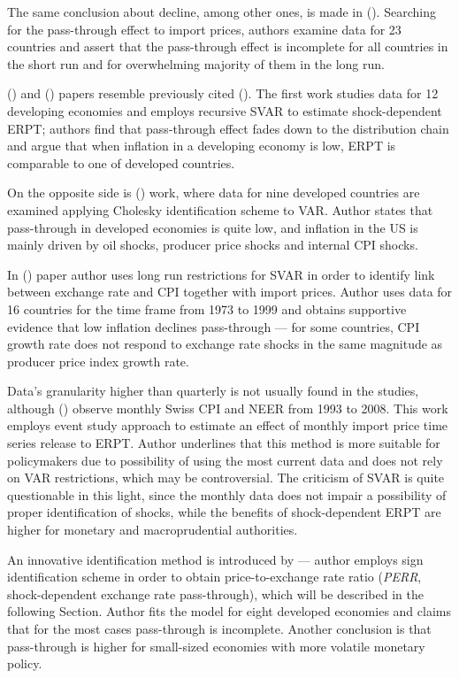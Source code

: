\documentclass[12pt, a4paper]{extarticle}
\begin{document}
The same conclusion about decline, among other ones, is made in (\cite{Campa2005}). Searching for the pass-through effect to import prices, authors examine data for 23 countries and assert that the pass-through effect is incomplete for all countries in the short run and for overwhelming majority of them in the long run.

(\cite{CaZorzi2007}) and (\cite{McCarthy2007}) papers resemble previously cited (\cite{Hahn2003}). The first work studies data for 12 developing economies and employs recursive SVAR to estimate shock-dependent ERPT; authors find that pass-through effect fades down to the distribution chain and argue that when inflation in a developing economy is low, ERPT is comparable to one of developed countries.

On the opposite side is (\cite{McCarthy2007}) work, where data for nine developed countries are examined applying Cholesky identification scheme to VAR. Author states that pass-through in developed economies is quite low, and inflation in the US is mainly driven by oil shocks, producer price shocks and internal CPI shocks.

In (\cite{Shambaugh2008}) paper author uses long run restrictions for SVAR in order to identify link between exchange rate and CPI together with import prices. Author uses data for 16 countries for the time frame from 1973 to 1999 and obtains supportive evidence that low inflation declines pass-through --- for some countries, CPI growth rate does not respond to exchange rate shocks in the same magnitude as producer price index growth rate.

Data's granularity higher than quarterly is not usually found in the studies, although (\cite{Amstad2010}) observe monthly Swiss CPI and NEER from 1993 to 2008. This work employs event study approach to estimate an effect of monthly import price time series release to ERPT. Author underlines that this method is more suitable for policymakers due to possibility of using the most current data and does not rely on VAR restrictions, which may be controversial. The criticism of SVAR is quite questionable in this light, since the monthly data does not impair a possibility of proper identification of shocks, while the benefits of shock-dependent ERPT are higher for monetary and macroprudential authorities.

An innovative identification method is introduced by \textcite{An2012} --- author employs sign identification scheme in order to obtain price-to-exchange rate ratio (\textit{PERR}, shock-dependent exchange rate pass-through), which will be described in the following Section. Author fits the model for eight developed economies and claims that for the most cases pass-through is incomplete. Another conclusion is that pass-through is higher for small-sized economies with more volatile monetary policy.
\end{document}
